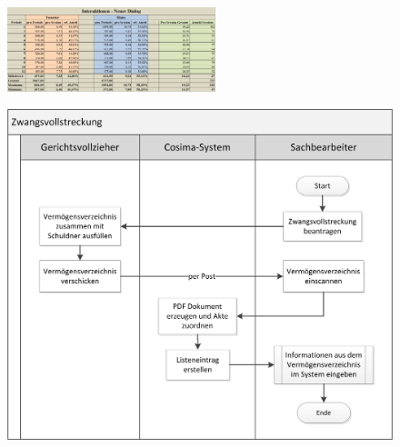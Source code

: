 \label{sec:datentabelleNeuerDialog}
\begin{figure}[H]
    \begin{minipage}[H]{1\textwidth}	
        \centering
         \includegraphics[angle=90, width=0.54\textwidth]{img/Datentabelle_Neuer_Dialog}
        \label{fig:datentabelleNeuerDialog}
    \end{minipage}
\end{figure}

\label{sec:ablaufZwangsvollstreckung}
\begin{figure}[H]
\centering
    \begin{minipage}[H]{1\textwidth}
        \includegraphics[width=1\textwidth]{img/Zwangsvollstreckung_Prozess}
        \label{fig:ablaufZwangsvollstreckung}
    \end{minipage}
\end{figure}

